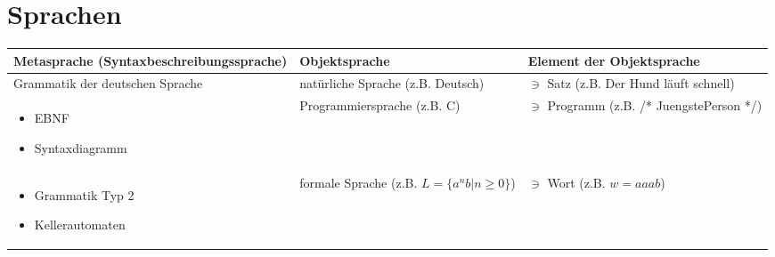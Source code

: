 \documentclass{article}
\begin{document}
\section*{Sprachen}

\begin{tabularx}{\textwidth}{X | X | X}
  Metasprache (Syntaxbeschreibungssprache) & Objektsprache & Element der Objektsprache \\
  \hline
  Grammatik der deutschen Sprache & natürliche Sprache (z.B. Deutsch) & $\ni$ Satz (z.B. Der Hund läuft schnell) \\
  \hline
  \begin{minipage}{\linewidth}
    \begin{itemize}
    \item EBNF
    \item Syntaxdiagramm
    \end{itemize}
  \end{minipage} & Programmiersprache (z.B. C) & $\ni$ Programm (z.B. /* JuengstePerson */) \\
  \hline
  \begin{minipage}{\linewidth}
    \begin{itemize}
    \item Grammatik Typ 2
    \item Kellerautomaten
    \end{itemize}
  \end{minipage} & formale Sprache (z.B. $L = \{ a^nb | n \geq 0\}$) & $\ni$ Wort (z.B. $w = aaab$) \\
\end{tabularx} \\
\end{document}

